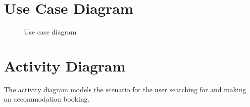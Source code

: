 \documentclass[a4paper]{article}
\begin{document}

\mbox{}
\thispagestyle{empty}

\tableofcontents
\clearpage
\setcounter{page}{1}


\clearpage

\clearpage

\section{Use Case Diagram}
\begin{figure}[h!]
	\centering
	\caption{Use case diagram}
\end{figure}


\section{Activity Diagram}

The activity diagram models the scenario for the user searching for and making an accommodation booking.
\end{document}
